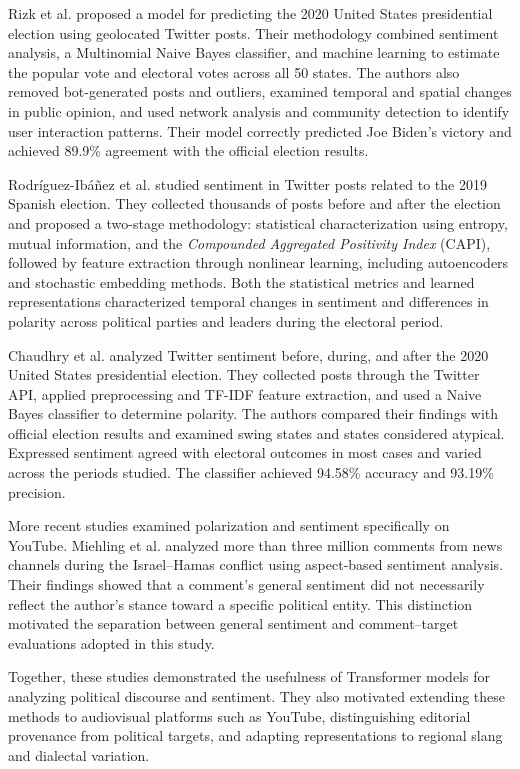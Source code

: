 \documentclass[conference, letterpaper]{IEEEtran}
\begin{document}
Rizk et al. \cite{rizk2023predicting} proposed a model for predicting the 2020 United States presidential election using geolocated Twitter posts. Their methodology combined sentiment analysis, a Multinomial Naive Bayes classifier, and machine learning to estimate the popular vote and electoral votes across all 50 states. The authors also removed bot-generated posts and outliers, examined temporal and spatial changes in public opinion, and used network analysis and community detection to identify user interaction patterns. Their model correctly predicted Joe Biden's victory and achieved 89.9\% agreement with the official election results.

Rodríguez-Ibáñez et al. \cite{rodriguez2021sentiment} studied sentiment in Twitter posts related to the 2019 Spanish election. They collected thousands of posts before and after the election and proposed a two-stage methodology: statistical characterization using entropy, mutual information, and the \textit{Compounded Aggregated Positivity Index} (CAPI), followed by feature extraction through nonlinear learning, including autoencoders and stochastic embedding methods. Both the statistical metrics and learned representations characterized temporal changes in sentiment and differences in polarity across political parties and leaders during the electoral period.

Chaudhry et al. \cite{chaudhry2022sentiment} analyzed Twitter sentiment before, during, and after the 2020 United States presidential election. They collected posts through the Twitter API, applied preprocessing and TF-IDF feature extraction, and used a Naive Bayes classifier to determine polarity. The authors compared their findings with official election results and examined swing states and states considered atypical. Expressed sentiment agreed with electoral outcomes in most cases and varied across the periods studied. The classifier achieved 94.58\% accuracy and 93.19\% precision.

More recent studies examined polarization and sentiment specifically on YouTube. Miehling et al. \cite{Miehling2025} analyzed more than three million comments from news channels during the Israel--Hamas conflict using aspect-based sentiment analysis. Their findings showed that a comment's general sentiment did not necessarily reflect the author's stance toward a specific political entity. This distinction motivated the separation between general sentiment and comment--target evaluations adopted in this study.

Together, these studies demonstrated the usefulness of Transformer models for analyzing political discourse and sentiment. They also motivated extending these methods to audiovisual platforms such as YouTube, distinguishing editorial provenance from political targets, and adapting representations to regional slang and dialectal variation.
\end{document}
